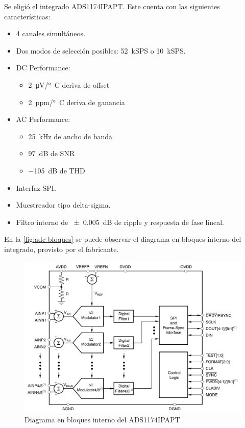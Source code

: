\documentclass[titlepage, 12pt]{article}
\begin{document}
Se eligió el integrado ADS1174IPAPT. Este cuenta con las siguientes características:
    \begin{itemize}
        \item 4 canales simultáneos.
        \item Dos modos de selección posibles: \SI{52}{kSPS} o \SI{10}{kSPS}.
        \item DC Performance:
        \begin{itemize}
            \item \SI{2}{\micro V/\degree C} deriva de offset
            \item \SI{2}{ppm/\degree C} deriva de ganancia
        \end{itemize}

        \item AC Performance:
        \begin{itemize}
            \item \SI{25}{kHz} de ancho de banda
            \item \SI{97}{dB} de SNR
            \item \SI{-105}{dB} de THD
        \end{itemize}
        \item Interfaz SPI.
        \item Muestreador tipo delta-sigma.
        \item Filtro interno de \SI{\pm 0.005}{dB} de ripple y respuesta de fase lineal.
    \end{itemize}

En la \autoref{fig:adc-bloques} se puede observar el diagrama en bloques interno del integrado, provisto por el fabricante.

    \begin{figure}[!htbp]
        \centering
        \includegraphics[scale=0.5]{images/adc-bloques.png}
        \caption{Diagrama en bloques interno del ADS1174IPAPT}
        \label{fig:adc-bloques}
    \end{figure}
\end{document}
